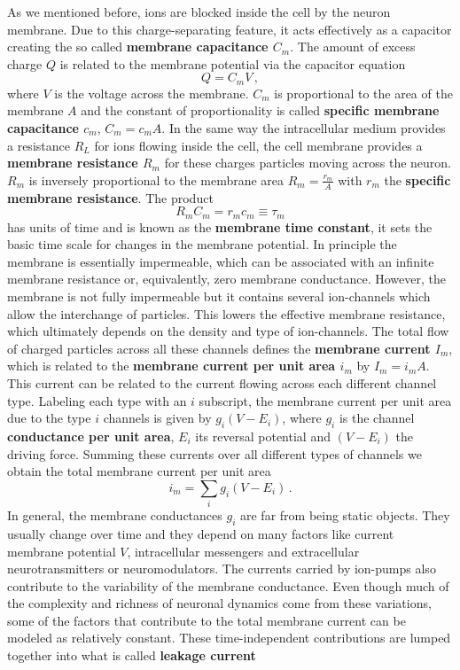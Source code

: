 \documentclass[titlepage]{article}
\begin{document}
As we mentioned before, ions are blocked inside the cell by the neuron membrane. Due to this charge-separating feature, it acts effectively as a capacitor creating the so called \textbf{membrane capacitance $C_m$}. The amount of excess charge $Q$ is related to the membrane potential via the capacitor equation
\begin{equation}\label{Cm}
Q = C_m V\,,
\end{equation}
where $V$ is the voltage across the membrane. $C_m$ is proportional to the area of the membrane $A$ and the constant of proportionality is called \textbf{specific membrane capacitance $c_m$}, $C_m = c_m A$. In the same way the intracellular medium provides a resistance $R_L$ for ions flowing inside the cell, the cell membrane provides a \textbf{membrane resistance $R_m$} for these charges particles moving across the neuron. $R_m$ is inversely proportional to the membrane area $R_m = \frac{r_m}{A}$ with $r_m$ the \textbf{specific membrane resistance}. The product
\begin{equation}\label{tm}
R_m C_m = r_m c_m \equiv \tau_m
\end{equation} 
has units of time and is known as the \textbf{membrane time constant}, it sets the basic time scale for changes in the membrane potential. In principle the membrane is essentially impermeable, which can be associated with an infinite membrane resistance or, equivalently, zero membrane conductance. However, the membrane is not fully impermeable but it contains several ion-channels which allow the interchange of particles. This lowers the effective membrane resistance, which ultimately depends on the density and type of ion-channels. The total flow of charged particles across all these channels defines the \textbf{membrane current $I_m$}, which is related to the \textbf{membrane current per unit area $i_m$} by $I_m = i_m A$. This current can be related to the current flowing across each different channel type. Labeling each type with an $i$ subscript, the membrane current per unit area due to the type $i$ channels is given by $g_i (V - E_i)$, where $g_i$ is the channel \textbf{conductance per unit area}, $E_i$ its reversal potential and $(V - E_i)$ the driving force. Summing these currents over all different types of channels we obtain the total membrane current per unit area
\begin{equation}\label{im}
i_m = \sum_{i} g_i (V - E_i)\,.
\end{equation}
In general, the membrane conductances $g_i$ are far from being static objects. They usually change over time and they depend on many factors like current membrane potential $V$, intracellular messengers and extracellular neurotransmitters or neuromodulators. The currents carried by ion-pumps also contribute to the variability of the membrane conductance. Even though much of the complexity and richness of neuronal dynamics come from these variations, some of the factors that contribute to the total membrane current can be modeled as relatively constant. These time-independent contributions are lumped together into what is called \textbf{leakage current}
\end{document}
